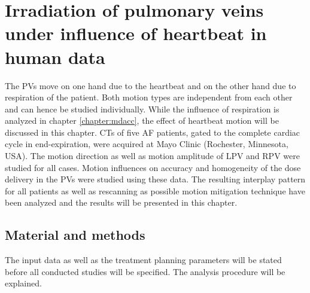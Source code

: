 
\chapter{Irradiation of pulmonary veins under influence of heartbeat in human data}
\label{chapter:human}
\minitoc

The PVs move on one hand due to the heartbeat and on the other hand due to respiration of the patient. 
Both motion types are independent from each other and can hence be studied individually. While the influence of respiration is analyzed in 
chapter \ref{chapter:mdacc}, the effect of heartbeat motion will be discussed in this chapter. 
CTs of five AF patients, gated to the complete cardiac cycle in end-expiration, were acquired at Mayo Clinic (Rochester, Minnesota, USA). 
The motion direction as well as motion amplitude of LPV and RPV were studied for all cases. 
Motion influences on accuracy and homogeneity of the dose delivery in the PVs were studied using these data. 
The resulting interplay pattern for all patients as well as 
rescanning as possible motion mitigation technique have been analyzed and the results will be presented in this chapter. 

\section{Material and methods}
The input data as well as the treatment planning parameters will be stated before all conducted studies will be specified. 
The analysis procedure will be explained.  


